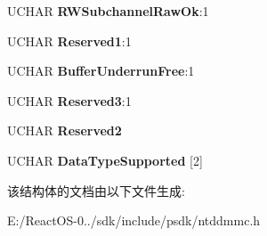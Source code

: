 \begin{DoxyCompactItemize}
\item 
\mbox{\label{struct___f_e_a_t_u_r_e___d_a_t_a___c_d___t_r_a_c_k___a_t___o_n_c_e_a31590b34e0151107c6451ac8f46c148a}} 
U\+C\+H\+AR {\bfseries R\+W\+Subchannel\+Raw\+Ok}\+:1
\item 
\mbox{\label{struct___f_e_a_t_u_r_e___d_a_t_a___c_d___t_r_a_c_k___a_t___o_n_c_e_ae42ed13528173b9dd5b43b705ac19269}} 
U\+C\+H\+AR {\bfseries Reserved1}\+:1
\item 
\mbox{\label{struct___f_e_a_t_u_r_e___d_a_t_a___c_d___t_r_a_c_k___a_t___o_n_c_e_aedaefa6f35423dd342622ecb97f6d0ca}} 
U\+C\+H\+AR {\bfseries Buffer\+Underrun\+Free}\+:1
\item 
\mbox{\label{struct___f_e_a_t_u_r_e___d_a_t_a___c_d___t_r_a_c_k___a_t___o_n_c_e_af02dc0444917cee421bf58adc16ed84b}} 
U\+C\+H\+AR {\bfseries Reserved3}\+:1
\item 
\mbox{\label{struct___f_e_a_t_u_r_e___d_a_t_a___c_d___t_r_a_c_k___a_t___o_n_c_e_a5942c47e46840c3930613a9fe8a9ff79}} 
U\+C\+H\+AR {\bfseries Reserved2}
\item 
\mbox{\label{struct___f_e_a_t_u_r_e___d_a_t_a___c_d___t_r_a_c_k___a_t___o_n_c_e_a182272cd7cd702f896f1edef6c1742a8}} 
U\+C\+H\+AR {\bfseries Data\+Type\+Supported} \mbox{[}2\mbox{]}
\end{DoxyCompactItemize}


该结构体的文档由以下文件生成\+:\begin{DoxyCompactItemize}
\item 
E\+:/\+React\+O\+S-\/0../sdk/include/psdk/ntddmmc.\+h\end{DoxyCompactItemize}
